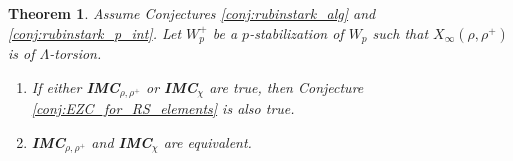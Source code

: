 \documentclass[12pt]{amsart}
\theoremstyle{defstyle}
\theoremstyle{thmstyle}
\newtheorem{theorem}[subsubsection]{Theorem}
\newtheorem{corollaire}[subsubsection]{Corollary}
\begin{document}

\begin{theorem}\label{thm:equivalence_IMCs}
    Assume Conjectures \ref{conj:rubinstark_alg} and \ref{conj:rubinstark_p_int}. Let $W_p^+$ be a $p$-stabilization of $W_p$ such that $X_\infty(\rho,\rho^+)$ is of $\Lambda$-torsion.
    \begin{enumerate}
    	\item If either \textbf{IMC}$_{\rho,\rho^+}$ or \textbf{IMC}$_\chi$ are true, then Conjecture \ref{conj:EZC_for_RS_elements} is also true.
    	\item \textbf{IMC}$_{\rho,\rho^+}$ and \textbf{IMC}$_\chi$ are equivalent.
    \end{enumerate}
\end{theorem}
\end{document}
